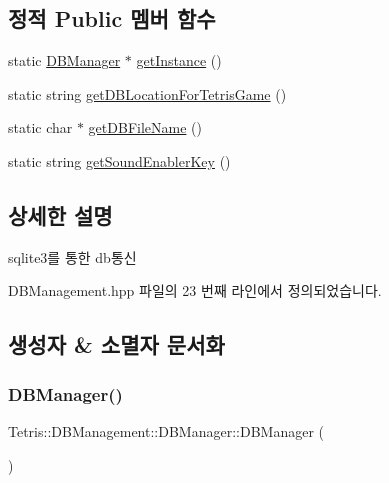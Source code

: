 \subsection*{정적 Public 멤버 함수}
\begin{DoxyCompactItemize}
\item 
static \hyperlink{class_tetris_1_1_d_b_management_1_1_d_b_manager}{D\+B\+Manager} $\ast$ \hyperlink{class_tetris_1_1_d_b_management_1_1_d_b_manager_a9cb81505055490211a9b5c79c3c22c18}{get\+Instance} ()
\item 
static string \hyperlink{class_tetris_1_1_d_b_management_1_1_d_b_manager_ae50cfd222e276a5ca27e17c886aa5dd5}{get\+D\+B\+Location\+For\+Tetris\+Game} ()
\item 
static char $\ast$ \hyperlink{class_tetris_1_1_d_b_management_1_1_d_b_manager_a5d49e7fac7d2a65973151a7fb81ea560}{get\+D\+B\+File\+Name} ()
\item 
static string \hyperlink{class_tetris_1_1_d_b_management_1_1_d_b_manager_ae8c98091466565c4c70971e6b7a42ce6}{get\+Sound\+Enabler\+Key} ()
\end{DoxyCompactItemize}


\subsection{상세한 설명}
sqlite3를 통한 db통신 

D\+B\+Management.\+hpp 파일의 23 번째 라인에서 정의되었습니다.



\subsection{생성자 \& 소멸자 문서화}
\mbox{\label{class_tetris_1_1_d_b_management_1_1_d_b_manager_a8271c37f255a2e2bc85a3e1896a32c43}} 
\subsubsection{\texorpdfstring{D\+B\+Manager()}{DBManager()}}
{\footnotesize\ttfamily Tetris\+::\+D\+B\+Management\+::\+D\+B\+Manager\+::\+D\+B\+Manager (\begin{DoxyParamCaption}{ }\end{DoxyParamCaption})\hspace{0.3cm}{\ttfamily [inline]}}



